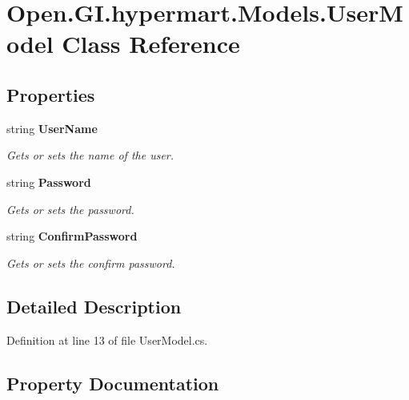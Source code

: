 \section{Open.\+G\+I.\+hypermart.\+Models.\+User\+Model Class Reference}
\label{class_open_1_1_g_i_1_1hypermart_1_1_models_1_1_user_model}


 


\subsection*{Properties}
\begin{DoxyCompactItemize}
\item 
string \textbf{ User\+Name}\hspace{0.3cm}{\ttfamily  [get, set]}
\begin{DoxyCompactList}\small\item\em Gets or sets the name of the user. \end{DoxyCompactList}\item 
string \textbf{ Password}\hspace{0.3cm}{\ttfamily  [get, set]}
\begin{DoxyCompactList}\small\item\em Gets or sets the password. \end{DoxyCompactList}\item 
string \textbf{ Confirm\+Password}\hspace{0.3cm}{\ttfamily  [get, set]}
\begin{DoxyCompactList}\small\item\em Gets or sets the confirm password. \end{DoxyCompactList}\end{DoxyCompactItemize}


\subsection{Detailed Description}




Definition at line 13 of file User\+Model.\+cs.



\subsection{Property Documentation}
\mbox{\label{class_open_1_1_g_i_1_1hypermart_1_1_models_1_1_user_model_a671662415ad880aaf5c2e7b43a83faa9}} 
